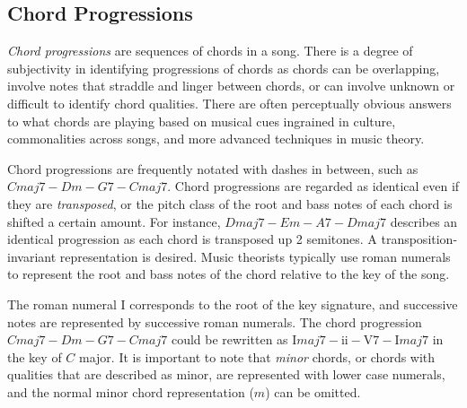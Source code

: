 \subsection{Chord Progressions}

\textit{Chord progressions} are sequences of chords in a song. There is a degree of subjectivity in identifying progressions of chords as chords can be overlapping, involve notes that straddle and linger between chords, or can involve unknown or difficult to identify chord qualities. There are often perceptually obvious answers to what chords are playing based on musical cues ingrained in culture, commonalities across songs, and more advanced techniques in music theory.

Chord progressions are frequently notated with dashes in between, such as $Cmaj7 - Dm - G7 - Cmaj7$. Chord progressions are regarded as identical even if they are \textit{transposed}, or the pitch class of the root and bass notes of each chord is shifted a certain amount. For instance, $Dmaj7 - Em - A7 - Dmaj7$ describes an identical progression as each chord is transposed up 2 semitones. A transposition-invariant representation is desired. Music theorists typically use roman numerals to represent the root and bass notes of the chord relative to the key of the song.

The roman numeral I corresponds to the root of the key signature, and successive notes are represented by successive roman numerals. The chord progression $Cmaj7 - Dm - G7 - Cmaj7$ could be rewritten as $\text{I}maj7 - \text{ii} - \text{V}7 - \text{I}maj7$ in the key of $C$ major. It is important to note that \textit{minor} chords, or chords with qualities that are described as minor, are represented with lower case numerals, and the normal minor chord representation ($m$) can be omitted.